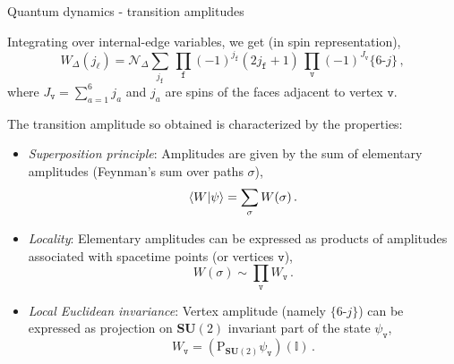 \documentclass{beamer}
\newcommand\italictext[1]{\textcolor{italics}{\textit{#1}}}
\begin{document}
\begin{frame}{Quantum dynamics - transition amplitudes}
    \begin{list}{\maltese}{\leftmargin=1em \itemindent=0em}
        \item<1-> Integrating over internal-edge variables, we get (in spin representation),
        \begin{equation}\label{ponz_reg}
            W_\Delta(j_\ell)=\mathcal{N}_\Delta\sum_{j_\mathtt{f}}\,\prod_\mathtt{f}(-1)^{j_\mathtt{f}}(2j_\mathtt{f}+1)\,\prod_\mathtt{v}(-1)^{J_\mathtt{v}}\{6\text{-}j\}\,,
        \end{equation}
        where $J_\mathtt{v}=\sum_{a=1}^{6}j_a$ and $j_a$ are spins of the faces adjacent to vertex $\mathtt{v}$.
        \item<2-> The transition amplitude so obtained is characterized by the properties:
        \begin{itemize}
            \item<2-> \italictext{Superposition principle}: Amplitudes are given by the sum of elementary amplitudes (Feynman's sum over paths $\sigma$),
            \vspace{-1pt}
            \begin{equation}
                \braket{W}{\psi}=\sum_\sigma W(\sigma)\,.
            \end{equation}
            \item<3-> \vspace{-2pt}\italictext{Locality}: Elementary amplitudes can be expressed as products of amplitudes associated with spacetime points (or vertices $\mathtt{v}$),
            \vspace{-1pt}
            \begin{equation}
                W(\sigma)\sim\prod_\mathtt{v}W_\mathtt{v}\,.
            \end{equation}
            \item<4-> \vspace{-2pt}\italictext{Local Euclidean invariance}: Vertex amplitude (namely $\{6\text{-}j\}$) can be expressed as projection on $\mathbf{SU}(2)$ invariant part of the state $\psi_\mathtt{v}$,
            \vspace{-1pt}
            \begin{equation}
                W_\mathtt{v}=(\operatorname{P_{\mathbf{SU}(2)}}\psi_\mathtt{v})(\mathbb{I})\,.
            \end{equation}
        \end{itemize}
    \end{list}
\end{frame}
\end{document}
